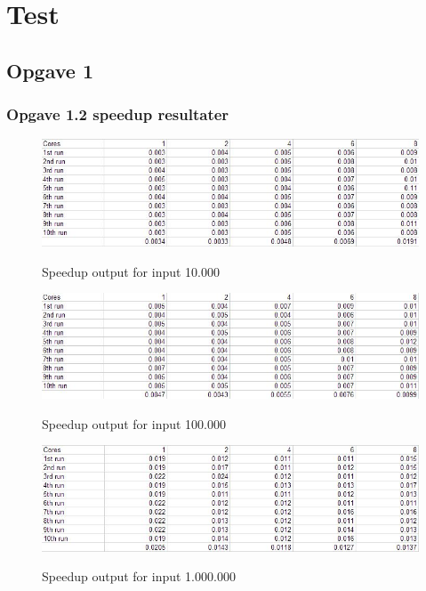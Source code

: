 \chapter{Test}
\section{Opgave 1}
\subsection{Opgave 1.2 speedup resultater}
\label{Speedup_Output}

\begin{figure}[h!]
\centering
\caption{Speedup output for input 10.000}
\includegraphics[width=\linewidth]{Images/oo2-1-2-SU10000}
\label{Speedup10.000}
\end{figure}

\begin{figure}[h!]
\centering
\caption{Speedup output for input 100.000}
\includegraphics[width=\linewidth]{Images/oo2-1-2-SU100000}
\label{Speedup100.000}
\end{figure}

\begin{figure}[h!]
\centering
\caption{Speedup output for input 1.000.000}
\includegraphics[width=\linewidth]{Images/oo2-1-2-SU1000000}
\label{Speedup1.000.000}
\end{figure}

